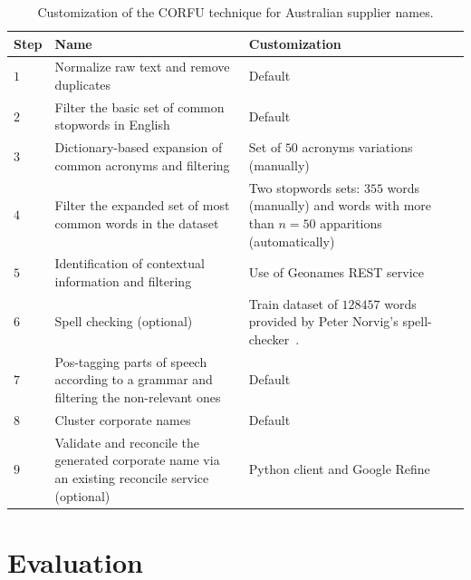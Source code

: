 \documentclass{llncs}
\begin{document}
\begin{table}[!htb]
\renewcommand{\arraystretch}{1.3}
\begin{center}
\begin{tabular}{|p{1cm}|p{5.5cm}|p{5.5cm}|}
\hline
  \textbf{Step} & \textbf{Name} & \textbf{Customization}  \\  \hline
  $1$ & Normalize raw text and remove duplicates & Default \\ \hline
  $2$ & Filter the basic set of common stopwords in English & Default\\ \hline
  $3$ & Dictionary-based expansion of common acronyms and filtering & Set of $50$ acronyms variations (manually) \\ \hline
  $4$ & Filter the expanded set of most common words in the dataset & Two stopwords sets: $355$ words (manually) and words with more than $n=50 $ apparitions (automatically) \\ \hline
  $5$ & Identification of contextual information and filtering & Use of Geonames REST service\\ \hline
  $6$ & Spell checking (optional) & Train dataset of $128457$ words provided by Peter Norvig's spell-checker~\cite{NorvigSpelling}. \\ \hline
  $7$ & Pos-tagging parts of speech according to a grammar and filtering the non-relevant ones & Default \\ \hline
  $8$ & Cluster corporate names & Default \\ \hline
  $9$ & Validate and reconcile the generated corporate name via an existing reconcile service (optional) & Python client and Google Refine \\ \hline
  \hline
  \end{tabular}
  \caption{Customization of the CORFU technique for Australian supplier names.}
  \label{config-corfu}
  \end{center}
\end{table} 

\section{Evaluation}
\end{document}
